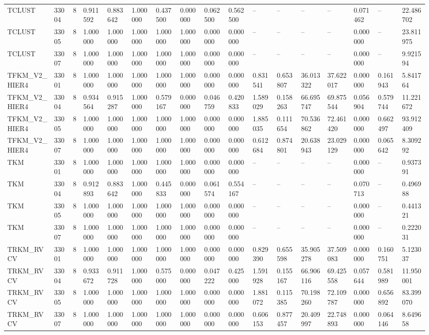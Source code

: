\begin{tabular}{lllllllllllllllll}
TCLUST & 33004 & 8 & 0.911592 & 0.883642 & 1.000000 & 0.437500 & 0.000000 & 0.062500 & 0.562500 & -- & -- & -- & -- & 0.071462 & -- & 22.486702 \\
TCLUST & 33005 & 8 & 1.000000 & 1.000000 & 1.000000 & 1.000000 & 1.000000 & 0.000000 & 0.000000 & -- & -- & -- & -- & 0.000000 & -- & 23.811975 \\
TCLUST & 33007 & 8 & 1.000000 & 1.000000 & 1.000000 & 1.000000 & 1.000000 & 0.000000 & 0.000000 & -- & -- & -- & -- & 0.000000 & -- & 9.921594 \\
TFKM\_V2\_HIER4 & 33001 & 8 & 1.000000 & 1.000000 & 1.000000 & 1.000000 & 1.000000 & 0.000000 & 0.000000 & 0.831541 & 0.653807 & 36.013322 & 37.622017 & 0.000000 & 0.161943 & 5.841764 \\
TFKM\_V2\_HIER4 & 33004 & 8 & 0.934564 & 0.915287 & 1.000000 & 0.579167 & 0.000000 & 0.046759 & 0.420833 & 1.589029 & 0.158263 & 66.695747 & 69.875544 & 0.056904 & 0.579744 & 11.221672 \\
TFKM\_V2\_HIER4 & 33005 & 8 & 1.000000 & 1.000000 & 1.000000 & 1.000000 & 1.000000 & 0.000000 & 0.000000 & 1.885035 & 0.111654 & 70.536862 & 72.461420 & 0.000000 & 0.662497 & 93.912409 \\
TFKM\_V2\_HIER4 & 33007 & 8 & 1.000000 & 1.000000 & 1.000000 & 1.000000 & 1.000000 & 0.000000 & 0.000000 & 0.612684 & 0.874801 & 20.638943 & 23.029129 & 0.000000 & 0.065642 & 8.309292 \\
TKM & 33001 & 8 & 1.000000 & 1.000000 & 1.000000 & 1.000000 & 1.000000 & 0.000000 & 0.000000 & -- & -- & -- & -- & 0.000000 & -- & 0.937391 \\
TKM & 33004 & 8 & 0.912893 & 0.883642 & 1.000000 & 0.445833 & 0.000000 & 0.061574 & 0.554167 & -- & -- & -- & -- & 0.070713 & -- & 0.496988 \\
TKM & 33005 & 8 & 1.000000 & 1.000000 & 1.000000 & 1.000000 & 1.000000 & 0.000000 & 0.000000 & -- & -- & -- & -- & 0.000000 & -- & 0.441321 \\
TKM & 33007 & 8 & 1.000000 & 1.000000 & 1.000000 & 1.000000 & 1.000000 & 0.000000 & 0.000000 & -- & -- & -- & -- & 0.000000 & -- & 0.222031 \\
TRKM\_RVCV & 33001 & 8 & 1.000000 & 1.000000 & 1.000000 & 1.000000 & 1.000000 & 0.000000 & 0.000000 & 0.829390 & 0.655598 & 35.905278 & 37.509083 & 0.000000 & 0.160751 & 5.123037 \\
TRKM\_RVCV & 33004 & 8 & 0.933672 & 0.911728 & 1.000000 & 0.575000 & 0.000000 & 0.047222 & 0.425000 & 1.591928 & 0.155167 & 66.906116 & 69.425558 & 0.057644 & 0.581989 & 11.950001 \\
TRKM\_RVCV & 33005 & 8 & 1.000000 & 1.000000 & 1.000000 & 1.000000 & 1.000000 & 0.000000 & 0.000000 & 1.881072 & 0.115385 & 70.198260 & 72.109787 & 0.000000 & 0.656892 & 83.399070 \\
TRKM\_RVCV & 33007 & 8 & 1.000000 & 1.000000 & 1.000000 & 1.000000 & 1.000000 & 0.000000 & 0.000000 & 0.606153 & 0.877457 & 20.409997 & 22.748893 & 0.000000 & 0.064146 & 8.649658 \\
\bottomrule
\end{tabular}
